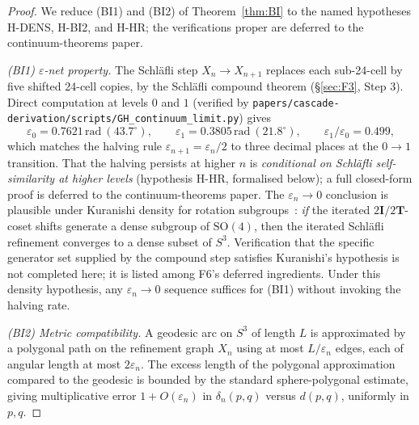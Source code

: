 \documentclass[12pt]{article}
\theoremstyle{definition}
\theoremstyle{remark}
\newcommand{\twoT}{2\mathbf{T}}
\newcommand{\twoI}{2\mathbf{I}}
\begin{document}
\begin{proof}
We reduce (BI1) and (BI2) of Theorem~\ref{thm:BI} to the named hypotheses H-DENS, H-BI2, and H-HR; the verifications proper are deferred to the continuum-theorems paper.

\emph{(BI1) $\varepsilon$-net property.} The Schl\"afli step $X_n \to X_{n+1}$ replaces each sub-24-cell by five shifted 24-cell copies, by the Schl\"afli compound theorem (\S\ref{sec:F3}, Step 3). Direct computation at levels $0$ and $1$ (verified by \texttt{papers/cascade-derivation/scripts/GH\_continuum\_limit.py}) gives
\begin{equation}
\varepsilon_0 = 0.7621\,\mathrm{rad}\ (43.7^\circ), \qquad \varepsilon_1 = 0.3805\,\mathrm{rad}\ (21.8^\circ), \qquad \varepsilon_1/\varepsilon_0 = 0.499,
\end{equation}
which matches the halving rule $\varepsilon_{n+1} = \varepsilon_n / 2$ to three decimal places at the $0 \to 1$ transition. That the halving persists at higher $n$ is \emph{conditional on Schl\"afli self-similarity at higher levels} (hypothesis H-HR, formalised below); a full closed-form proof is deferred to the continuum-theorems paper. The $\varepsilon_n \to 0$ conclusion is plausible under Kuranishi density for rotation subgroups~\citep{Kuranishi1951}: \emph{if} the iterated $\twoI/\twoT$-coset shifts generate a dense subgroup of $\mathrm{SO}(4)$, then the iterated Schl\"afli refinement converges to a dense subset of $S^3$. Verification that the specific generator set supplied by the compound step satisfies Kuranishi's hypothesis is not completed here; it is listed among F6's deferred ingredients. Under this density hypothesis, any $\varepsilon_n \to 0$ sequence suffices for (BI1) without invoking the halving rate.

\emph{(BI2) Metric compatibility.} A geodesic arc on $S^3$ of length $L$ is approximated by a polygonal path on the refinement graph $X_n$ using at most $L / \varepsilon_n$ edges, each of angular length at most $2\varepsilon_n$. The excess length of the polygonal approximation compared to the geodesic is bounded by the standard sphere-polygonal estimate, giving multiplicative error $1 + O(\varepsilon_n)$ in $\delta_n(p, q)$ versus $d(p, q)$, uniformly in $p, q$.


\end{proof}
\end{document}
